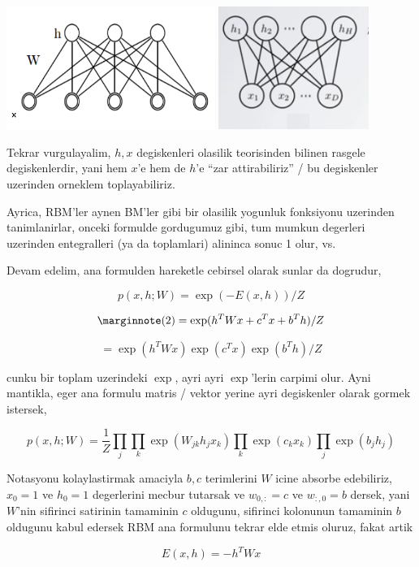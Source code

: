 \documentclass[12pt,fleqn]{article}\usepackage{../common}
\begin{document}
\includegraphics[height=4cm]{rbm_01.png}
\includegraphics[height=4cm]{rbm_02.png}

Tekrar vurgulayalim, $h,x$ degiskenleri olasilik teorisinden bilinen
rasgele degiskenlerdir, yani hem $x$'e hem de $h$'e ``zar attirabiliriz'' /
bu degiskenler uzerinden orneklem toplayabiliriz.

Ayrica, RBM'ler aynen BM'ler gibi bir olasilik yogunluk fonksiyonu
uzerinden tanimlanirlar, onceki formulde gordugumuz gibi, tum mumkun
degerleri uzerinden entegralleri (ya da toplamlari) alininca sonuc 1 olur,
vs.

Devam edelim, ana formulden hareketle cebirsel olarak sunlar da dogrudur,

$$ p(x,h;W) = \exp (-E(x,h)) / Z $$

$$ 
\mlabel{2}
= \exp (h^TWx + c^Tx + b^Th ) / Z $$

$$ = \exp (h^TWx) \exp (c^Tx) \exp(b^Th) / Z $$

cunku bir toplam uzerindeki $\exp$, ayri ayri $\exp$'lerin carpimi
olur. Ayni mantikla, eger ana formulu matris / vektor yerine ayri
degiskenler olarak gormek istersek,

$$ 
p(x,h;W) = \frac{1}{Z}
\prod_j \prod_k \exp (W_{jk}h_jx_k) \prod_k \exp(c_kx_k) \prod_j \exp(b_jh_j) 
 $$

Notasyonu kolaylastirmak amaciyla $b,c$ terimlerini $W$ icine absorbe
edebiliriz, $x_0=1$ ve $h_0=1$ degerlerini mecbur tutarsak ve $w_{0,:}=c$
ve $w_{:,0}=b$ dersek, yani $W$'nin sifirinci satirinin tamaminin $c$
oldugunu, sifirinci kolonunun tamaminin $b$ oldugunu kabul edersek
RBM ana formulunu tekrar elde etmis oluruz, fakat artik

$$ E(x,h) = -h^TWx $$
\end{document}
